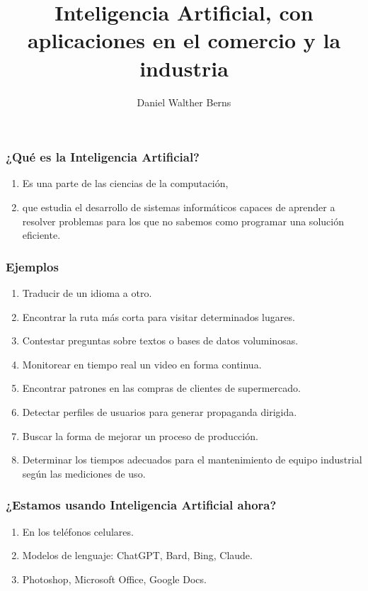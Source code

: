 \documentclass[11pt]{beamer}
\begin{document}
	\author{Daniel Walther Berns}
	\title{Inteligencia Artificial, con aplicaciones en el comercio y la industria}
	\begin{frame}[plain]
		\maketitle
	\end{frame}
	
	\begin{frame}
		\frametitle{¿Qué es la Inteligencia Artificial?}
		
		\begin{enumerate}
			\item Es una parte de las ciencias de la computación,
			\item que estudia el desarrollo de sistemas informáticos capaces de aprender a resolver problemas para los que no sabemos como programar una solución eficiente.
		\end{enumerate}
	\end{frame}

    \begin{frame}
    	\frametitle{Ejemplos}
    	
    	\begin{enumerate}
    		\item Traducir de un idioma a otro.
    		\item Encontrar la ruta más corta para visitar determinados lugares.
    		\item Contestar preguntas sobre textos o bases de datos voluminosas.
    		\item Monitorear en tiempo real un video en forma continua.
    		\item Encontrar patrones en las compras de clientes de supermercado.
    		\item Detectar perfiles de usuarios para generar propaganda dirigida.
    		\item Buscar la forma de mejorar un proceso de producción.    		
    		\item Determinar los tiempos adecuados para el mantenimiento de equipo industrial según las mediciones de uso.
    	\end{enumerate}
    \end{frame}

    \begin{frame}
    	\frametitle{¿Estamos usando Inteligencia Artificial ahora?}
    	
    	\begin{enumerate}
    		\item En los teléfonos celulares.
    		\item Modelos de lenguaje: ChatGPT, Bard, Bing, Claude.
    		\item Photoshop, Microsoft Office, Google Docs.
    	\end{enumerate}
    \end{frame}
\end{document}

